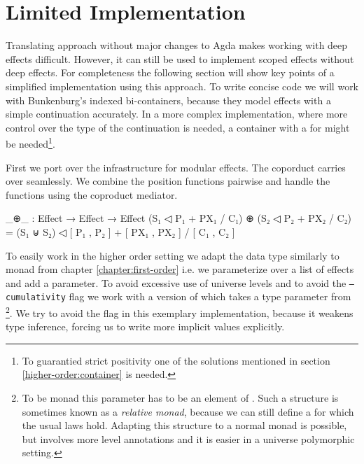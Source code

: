 \section{Limited Implementation}
\label{higher-order:limited-impl}

Translating \textcite{DBLP:conf/haskell/WuSH14} approach without major changes
to Agda makes working  with deep effects difficult.
However, it can still be used to implement scoped effects without deep effects.
For completeness the following section will show key points of a simplified
implementation using this approach.
To write concise code we will work with Bunkenburg's indexed bi-containers,
because they model effects with a simple continuation accurately.
In a more complex implementation, where more control over the type of the
continuation is needed, a container with a  for 
might be needed\footnote{To guarantied strict positivity one of the solutions
  mentioned in section \ref{higher-order:container} is needed.}.

First we port over the infrastructure for modular effects.
The coporduct carries over seamlessly.
We combine the position functions pairwise and handle the 
functions using the coproduct mediator.

\begin{code}
_⊕_ : Effect → Effect → Effect
(S₁ ◁ P₁ + PX₁ / C₁) ⊕ (S₂ ◁ P₂ + PX₂ / C₂) =
  (S₁ ⊎ S₂) ◁ [ P₁ , P₂ ] + [ PX₁ , PX₂ ] / [ C₁ , C₂ ]
\end{code}
To easily work in the higher order setting we adapt the 
data type similarly to  monad from chapter
\ref{chapter:first-order} i.e. we parameterize over a list of effects and add a
 parameter.
To avoid excessive use of universe levels and to avoid the \texttt{--cumulativity}
flag we work with a version of  which takes a type parameter
from \footnote{To be monad this parameter has to be an element
  of . Such a structure is sometimes known as a \textit{relative
  monad}, because we can still define a \AgdaFunction{>>=} for which the usual
  laws hold. Adapting this structure to a normal monad is possible, but involves
  more level annotations and it is easier in a universe polymorphic setting.}.
We try to avoid the flag in this exemplary implementation, because it weakens
type inference, forcing us to write more implicit values explicitly.

